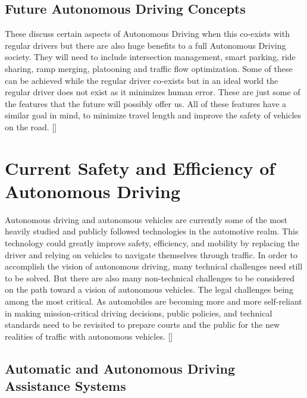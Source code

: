 \documentclass{article}
\begin{document}
\subsection{Future Autonomous Driving Concepts}

These discuss certain aspects of Autonomous Driving when this co-exists with regular drivers but there are also huge benefits to a full Autonomous Driving society. They will need to include intersection management, smart parking, ride sharing, ramp merging, platooning and traffic flow optimization. Some of these can be achieved while the regular driver co-exists but in an ideal world the regular driver does not exist as it minimizes human error. These are just some of the features that the future will possibly offer us. All of these features have a similar goal in mind, to minimize travel length and improve the safety of vehicles on the road. [\textcite{mariani2021coordination}]

\section{Current Safety and Efficiency of Autonomous Driving}

Autonomous driving and autonomous vehicles are currently some of the most heavily studied and publicly followed technologies in the automotive realm. This technology could greatly improve safety, efficiency, and mobility by replacing the driver and relying on vehicles to navigate themselves through traffic. In order to accomplish the vision of autonomous driving, many technical challenges need still to be solved. But there are also many non-technical challenges to be considered on the path toward a vision of autonomous vehicles. The legal challenges being among the most critical. As automobiles are becoming more and more self-reliant in making mission-critical driving decisions, public policies, and technical standards need to be revisited to prepare courts and the public for the new realities of traffic with autonomous vehicles. [\textcite{beiker2012legal}]

\subsection{Automatic and Autonomous Driving Assistance Systems}
\end{document}
